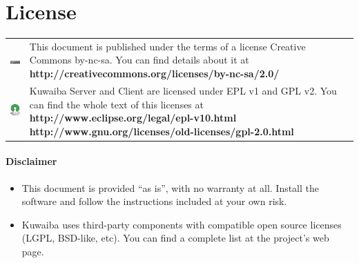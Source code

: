 \documentclass[a4paper]{article}
\begin{document}
	\section{License}
		\begin{table}[ht]
			\centering
			\begin{tabular}{cp{10cm}}
				
				\includegraphics[]{img/cc_license_logo.jpg} & This document is published under the terms of a license Creative Commons by-nc-sa. You can find details about it at\linebreak
				\textbf{http://creativecommons.org/licenses/by-nc-sa/2.0/ } \\

				\includegraphics[width=2cm]{img/osi_logo.jpg} & Kuwaiba Server and Client are licensed under EPL v1 and GPL v2. You can find the whole text of this licenses at \linebreak
				\textbf{http://www.eclipse.org/legal/epl-v10.html} \linebreak
				\textbf{http://www.gnu.org/licenses/old-licenses/gpl-2.0.html} \\
			\end{tabular}
		\end{table}
		\paragraph{Disclaimer} \hspace{0pt}
		\begin{itemize}
			
			
			\item This document is provided “as is”, with no warranty at all. Install the software and follow the instructions included at your own risk.
			
			\item Kuwaiba uses third-party components with compatible open source licenses (LGPL, BSD-like, etc). You can find a complete list at the project's web page.
		\end{itemize}
	
	\newpage
\end{document}
